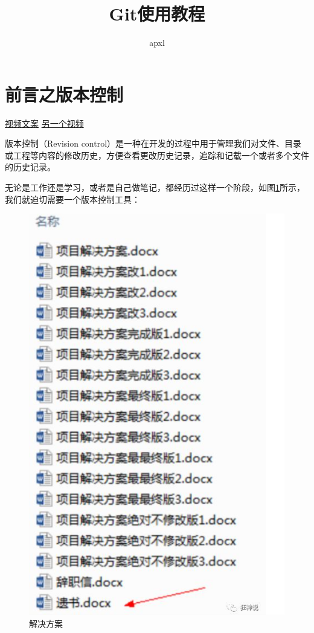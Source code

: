 \documentclass{article}
\title{Git使用教程}
\author{apxl}
\date{\zhtoday}
\begin{document}
\maketitle

\section{前言之版本控制}

\href{https://mp.weixin.qq.com/s/Bf7uVhGiu47uOELjmC5uXQ}{视频文案}
\href{https://www.bilibili.com/video/BV1PG411L7of/?spm_id_from=333.788&vd_source=355508b521fc8e6490c52cd173d7b758}{另一个视频}

版本控制（Revision control）是一种在开发的过程中用于管理我们对文件、目录或工程等内容的修改历史，方便查看更改历史记录，追踪和记载一个或者多个文件的历史记录。

无论是工作还是学习，或者是自己做笔记，都经历过这样一个阶段，如图\ref{1.1}所示，我们就迫切需要一个版本控制工具：

\begin{figure}\label{1.1}
    \centering    
    \includegraphics[width=\textwidth,keepaspectratio]{image/图片1.png}
    \caption{解决方案}
\end{figure}
\end{document}
